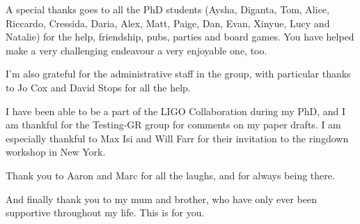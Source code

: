 \documentclass[
12pt, %
english, %
doublespacing, %
headsepline, %
]{MastersDoctoralThesis} %
\begin{document}
\begin{singlespacing}
\begin{acknowledgements}
A special thanks goes to all the PhD students (Aysha, Diganta, Tom, Alice, Riccardo, Cressida, Daria, Alex, Matt, Paige, Dan, Evan, Xinyue, Lucy and Natalie) for the help, friendship, pubs, parties and board games. 
You have helped make a very challenging endeavour a very enjoyable one, too.

I’m also grateful for the administrative staff in the group, with particular thanks to Jo Cox and David Stops for all the help. 

I have been able to be a part of the LIGO Collaboration during my PhD, and I am thankful for the Testing-GR group for comments on my paper drafts. 
I am especially thankful to Max Isi and Will Farr for their invitation to the ringdown workshop in New York.

Thank you to Aaron and Marc for all the laughs, and for always being there.

And finally thank you to my mum and brother, who have only ever been supportive throughout my life. 
This is for you.

\end{acknowledgements}

\end{singlespacing}






\tableofcontents %

\listoffigures %



\end{document}
